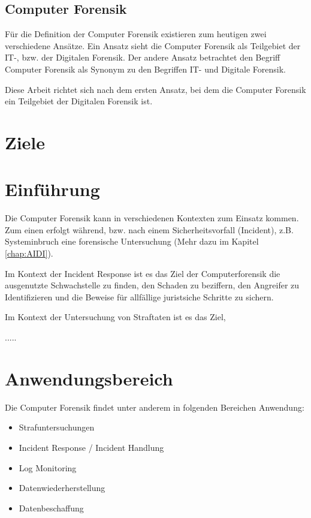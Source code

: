 \subsection{Computer Forensik}
Für die Definition der Computer Forensik existieren zum heutigen zwei verschiedene Ansätze. Ein Ansatz sieht die Computer Forensik als Teilgebiet der IT-, bzw. der Digitalen Forensik. Der andere Ansatz betrachtet den Begriff Computer Forensik als Synonym zu den Begriffen IT- und Digitale Forensik.

Diese Arbeit richtet sich nach dem ersten Ansatz, bei dem die Computer Forensik ein Teilgebiet der Digitalen Forensik ist.




\section{Ziele}

\section{Einführung}
Die Computer Forensik kann in verschiedenen Kontexten zum Einsatz kommen. Zum einen erfolgt während, bzw. nach einem Sicherheitsvorfall (Incident), z.B. Systeminbruch eine forensische Untersuchung (Mehr dazu im Kapitel \ref{chap:AIDI}). 

Im Kontext der Incident Response ist es das Ziel der Computerforensik die ausgenutzte Schwachstelle zu finden, den Schaden zu beziffern, den Angreifer zu Identifizieren und die Beweise für allfällige juristsiche Schritte zu sichern.

Im Kontext der Untersuchung von Straftaten ist es das Ziel, 

.....


\section{Anwendungsbereich}
Die Computer Forensik findet unter anderem in folgenden Bereichen Anwendung:

\begin{itemize}
\item Strafuntersuchungen
\item Incident Response / Incident Handlung
\item Log Monitoring
\item Datenwiederherstellung
\item Datenbeschaffung
\end{itemize}


